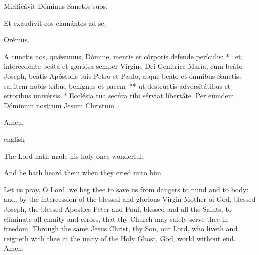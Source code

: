 \texteparacol
{\noindent \vv Mirificávit Dóminus San\-ctos suos.

\noindent \rr Et exaudívit eos clamántes ad se.

Orémus.

\lettrine{A}{} cun\-ctis nos, quǽsumus, Dómine, mentis et córporis defende perículis: \nolinebreak[4]*~ et, intercedénte beáta et gloriósa semper Vírgine Dei Genitríce María, cum beáto Joseph, beátis Apóstolis tuis Petro et Paulo, atque beáto \nomen{} et ómnibus Sanctis, salútem nobis tríbue benígnus et pacem~** ut destructis adversitátibus et erroribus univérsis~* Ecclésia tua secúra tibi sérviat libertáte. Per eúmdem Dóminum nostrum Jesum Christum.

\rr Amen.}
{english}{\noindent \vv The Lord hath made his holy ones wonderful.

\noindent \rr And he hath heard them when they cried unto him.

\noindent Let us pray. O Lord, we beg thee to save us from dangers to mind and to body: and, by the intercession of the blessed and glorious Virgin Mother of God, blessed Joseph, the blessed Apostles Peter and Paul, blessed \nomen{} and all the Saints, to eliminate all enmity and errors, that thy Church may safely serve thee in freedom.
Through the same Jesus Christ, thy Son, our Lord, who liveth and reigneth with thee in the unity of the Holy Ghost, God, world without end. Amen.}